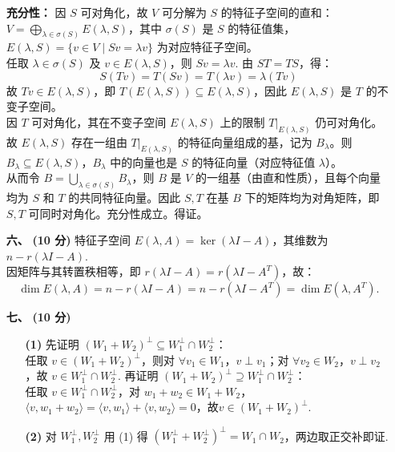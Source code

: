 \documentclass{ctexart}
\begin{document}
\begin{enumerate}
    \textbf{充分性：} 因 \(S\) 可对角化，故 \(V\) 可分解为 \(S\) 的特征子空间的直和：\(V = \displaystyle\bigoplus_{\lambda \in \sigma(S)} E(\lambda, S)\)，其中 \(\sigma(S)\) 是 \(S\) 的特征值集，\(E(\lambda, S) = \{v \in V \mid Sv = \lambda v\}\) 为对应特征子空间。 \\
    任取 \(\lambda \in \sigma(S)\) 及 \(v \in E(\lambda, S)\)，则 \(Sv = \lambda v\). 由 \(ST = TS\)，得：  
    \[
    S(Tv) = T(Sv) = T(\lambda v) = \lambda (Tv)
    \]  
    故 \(Tv \in E(\lambda, S)\)，即 \(T(E(\lambda, S)) \subseteq E(\lambda, S)\)，因此 \(E(\lambda, S)\) 是 \(T\) 的不变子空间。 \\
    因 \(T\) 可对角化，其在不变子空间 \(E(\lambda, S)\) 上的限制 \(T|_{E(\lambda, S)}\) 仍可对角化。故 \(E(\lambda, S)\) 存在一组由 \(T|_{E(\lambda, S)}\) 的特征向量组成的基，记为 \(B_\lambda\)。则 \(B_\lambda \subseteq E(\lambda, S)\)，\(B_\lambda\) 中的向量也是 \(S\) 的特征向量（对应特征值 \(\lambda\)）。 \\
    从而令 \(B = \displaystyle\bigcup_{\lambda \in \sigma(S)} B_\lambda\)，则 \(B\) 是 \(V\) 的一组基（由直和性质），且每个向量均为 \(S\) 和 \(T\) 的共同特征向量。因此 \(S,T\) 在基 \(B\) 下的矩阵均为对角矩阵，即 \(S,T\) 可同时对角化。充分性成立。得证。
    \item[\textbf{六、}] \textbf{(10 分)} 特征子空间 \(E(\lambda, A) = \ker(\lambda I - A)\)，其维数为 \(n - r(\lambda I - A)\).\\
    因矩阵与其转置秩相等，即 \(r(\lambda I - A) = r(\lambda I - A^T)\)，故：  
    \[
    \dim E(\lambda, A) = n - r(\lambda I - A) = n - r(\lambda I - A^T) = \dim E(\lambda, A^T).
    \]
    \item[\textbf{七、}] \textbf{(10 分)} 
    \begin{enumerate}
        \item[\textbf{(1)}] 先证明 \((W_1 + W_2)^\perp \subseteq W_1^\perp \cap W_2^\perp\)：  \\
        任取 \(v\in(W_1 + W_2)^\perp\)，则对 $\forall v_1\in W_1$，\(v\perp v_1\)；对 $\forall v_2\in W_2$，\(v\perp v_2\)，故 \(v\in W_1^\perp \cap W_2^\perp\).  
        再证明 \((W_1 + W_2)^\perp \supseteq W_1^\perp \cap W_2^\perp\)：\\
        任取 \(v\in W_1^\perp \cap W_2^\perp\)，对 \(w_1 + w_2\in W_1 + W_2\)，\(\langle v, w_1 + w_2\rangle = \langle v, w_1\rangle + \langle v, w_2\rangle = 0\)，故\(v\in(W_1 + W_2)^\perp\). 
        \item[\textbf{(2)}] 对 \(W_1^\perp, W_2^\perp\) 用 (1) 得 \((W_1^\perp + W_2^\perp)^\perp = W_1 \cap W_2\)，两边取正交补即证.  

\end{enumerate}
\end{enumerate}
\end{document}
